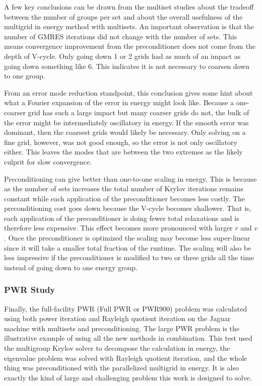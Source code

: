 A few key conclusions can be drawn from the multiset studies about the tradeoff between the number of groups per set and about the overall usefulness of the multigrid in energy method with multisets. An important observation is that the number of GMRES iterations did not change with the number of sets. This means convergence improvement from the preconditioner does not come from the depth of V-cycle. Only going down 1 or 2 grids had as much of an impact as going down something like 6. This indicates it is not necessary to coarsen down to one group. 

From an error mode reduction standpoint, this conclusion gives some hint about what a Fourier expansion of the error in energy might look like. Because a one-coarser grid has such a large impact but many coarser grids do not, the bulk of the error might be intermediately oscillatory in energy. If the smooth error was dominant, then the coarsest grids would likely be necessary. Only solving on a fine grid, however, was not good enough, so the error is not only oscillatory either. This leaves the modes that are between the two extremes as the likely culprit for slow convergence. 

Preconditioning can give better than one-to-one scaling in energy. This is because as the number of sets increases the total number of Krylov iterations remains constant while each application of the preconditioner becomes less costly. The preconditioning cost goes down because the V-cycle becomes shallower. That is, each application of the preconditioner is doing fewer total relaxations and is therefore less expensive. This effect becomes more pronounced with larger $r$ and $v$. Once the preconditioner is optimized the scaling may become less super-linear since it will take a smaller total fraction of the runtime. The scaling will also be less impressive if the preconditioner is modified to two or three grids all the time instead of going down to one energy group.

\subsubsection{PWR Study}
Finally, the full-facility PWR (Full PWR or PWR900) problem was calculated using both power iteration and Rayleigh quotient iteration on the Jaguar machine with multisets and preconditioning. The large PWR problem is the illustrative example of using all the new methods in combination. This test used the multigroup Krylov solver to decompose the calculation in energy, the eigenvalue problem was solved with Rayleigh quotient iteration, and the whole thing was preconditioned with the parallelized multigrid in energy. It is also exactly the kind of large and challenging problem this work is designed to solve. %

